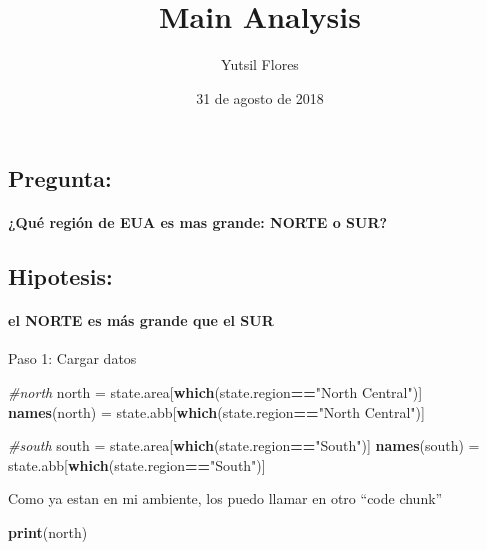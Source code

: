 \documentclass[]{article}
\title{Main Analysis}
\author{Yutsil Flores}
\date{31 de agosto de 2018}
\newenvironment{Shaded}{\begin{snugshade}}{\end{snugshade}}
\newcommand{\KeywordTok}[1]{\textcolor[rgb]{0.13,0.29,0.53}{\textbf{#1}}}
\newcommand{\StringTok}[1]{\textcolor[rgb]{0.31,0.60,0.02}{#1}}
\newcommand{\CommentTok}[1]{\textcolor[rgb]{0.56,0.35,0.01}{\textit{#1}}}
\newcommand{\OperatorTok}[1]{\textcolor[rgb]{0.81,0.36,0.00}{\textbf{#1}}}
\newcommand{\NormalTok}[1]{#1}
\let\oldparagraph\paragraph
\renewcommand{\paragraph}[1]{\oldparagraph{#1}\mbox{}}
\begin{document}
\maketitle

\subsection{Pregunta:}\label{pregunta}

\paragraph{¿Qué región de EUA es mas grande: NORTE o
SUR?}\label{que-region-de-eua-es-mas-grande-norte-o-sur}

\subsection{Hipotesis:}\label{hipotesis}

\paragraph{el NORTE es más grande que el
SUR}\label{el-norte-es-mas-grande-que-el-sur}

Paso 1: Cargar datos

\begin{Shaded}
\begin{Highlighting}[]
\CommentTok{#north}
\NormalTok{north =}\StringTok{ }\NormalTok{state.area[}\KeywordTok{which}\NormalTok{(state.region}\OperatorTok{==}\StringTok{"North Central"}\NormalTok{)]}
\KeywordTok{names}\NormalTok{(north) =}\StringTok{ }\NormalTok{state.abb[}\KeywordTok{which}\NormalTok{(state.region}\OperatorTok{==}\StringTok{"North Central"}\NormalTok{)]}

\CommentTok{#south}
\NormalTok{south =}\StringTok{ }\NormalTok{state.area[}\KeywordTok{which}\NormalTok{(state.region}\OperatorTok{==}\StringTok{"South"}\NormalTok{)]}
\KeywordTok{names}\NormalTok{(south) =}\StringTok{ }\NormalTok{state.abb[}\KeywordTok{which}\NormalTok{(state.region}\OperatorTok{==}\StringTok{"South"}\NormalTok{)]}
\end{Highlighting}
\end{Shaded}

Como ya estan en mi ambiente, los puedo llamar en otro ``code chunk''

\begin{Shaded}
\begin{Highlighting}[]
\KeywordTok{print}\NormalTok{(north)}
\end{Highlighting}
\end{Shaded}
\end{document}
